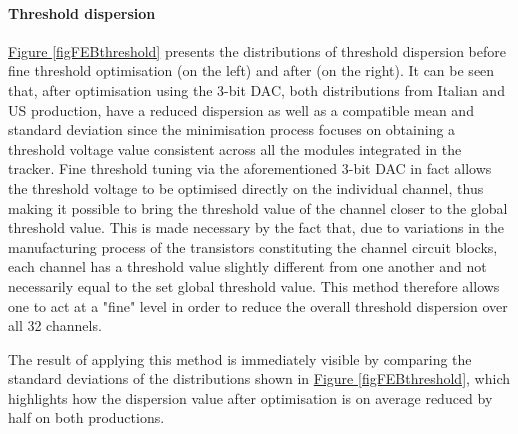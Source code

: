 \paragraph{Threshold dispersion} \hyperref[figFEBthreshold]{Figure \ref{figFEBthreshold}} presents the distributions of threshold dispersion before fine threshold optimisation (on the left) and after (on the right). It can be seen that, after optimisation using the 3-bit DAC, both distributions from Italian and US production, have a reduced dispersion as well as a compatible mean and standard deviation since the minimisation process focuses on obtaining a threshold voltage value consistent across all the modules integrated in the tracker. Fine threshold tuning via the aforementioned 3-bit DAC in fact allows the threshold voltage to be optimised directly on the individual channel, thus making it possible to bring the threshold value of the channel closer to the global threshold value. This is made necessary by the fact that, due to variations in the manufacturing process of the transistors constituting the channel circuit blocks, each channel has a threshold value slightly different from one another and not necessarily equal to the set global threshold value. This method therefore allows one to act at a "fine" level in order to reduce the overall threshold dispersion over all 32 channels. 

\par
The result of applying this method is immediately visible by comparing the standard deviations of the distributions shown in \hyperref[figFEBthreshold]{Figure \ref{figFEBthreshold}}, which highlights how the dispersion value after optimisation is on average reduced by half on both productions.

